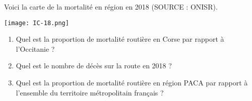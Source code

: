 
Voici la carte de la mortalité en région en 2018 (SOURCE : ONISR).

\begin{center}
\texttt{[image: IC-18.png]}
\end{center}


\begin{enumerate}
\item Quel est la proportion de mortalité routière en Corse par rapport à l'Occitanie ?
\item Quel est le nombre de décès sur la route en 2018 ? 
\item Quel est la proportion de mortalité routière en région PACA par rapport à l'ensemble du territoire métropolitain français ? 
\end{enumerate} 